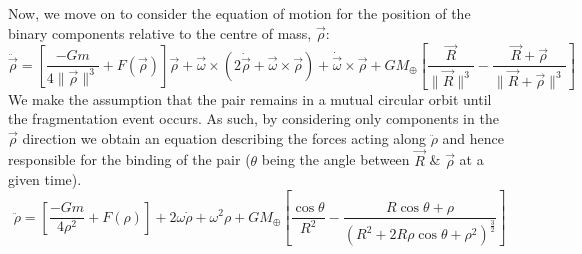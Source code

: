 \documentclass[letterpaper, preprint, paper,11pt]{AAS}	%
\begin{document}
Now, we move on to consider the equation of motion for the position of the binary components relative to the centre of mass, $\vec{\rho}$: 
\begin{equation}
\ddot{\vec{\rho}} = \left[\frac{-Gm}{4\|\vec{\rho}\|^{3}}+F(\vec{\rho})\right]\vec{\rho}+\vec{\omega}\times(2\dot{\vec{\rho}}+\vec{\omega}\times\vec{\rho})+\dot{\vec{\omega}}\times\vec{\rho}+{GM_\oplus}\left[\frac{\vec{R}}{\|\vec{R}\|^{3}}-\frac{\vec{R}+\vec{\rho}}{\|\vec{R}+\vec{\rho}\|^{3}}\right]
\end{equation}
We make the assumption that the pair remains in a mutual circular orbit until the fragmentation event occurs. As such, by considering only components in the $\vec{\rho}$ direction we obtain an equation describing the forces acting along $\ddot{\rho}$ and hence responsible for the binding of the pair ($\theta$ being the angle between $\vec{R}$ \& $\vec{\rho}$ at a given time).
\begin{equation}\label{eq:rdd}
\ddot{\rho} = \left[\frac{-Gm}{4\rho^{2}}+F(\rho)\right]+2\omega\dot{\rho}+\omega^{2}\rho+{GM_\oplus}\left[\frac{\cos\theta}{R^{2}}-\frac{R\cos\theta+\rho}{(R^{2}+2R\rho\cos\theta+\rho^{2})^\frac{3}{2}}\right]
\end{equation}

 
\end{document}
